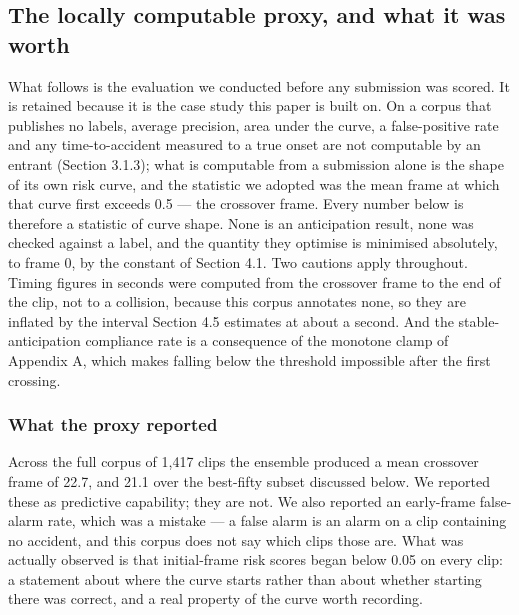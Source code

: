 \subsection{The locally computable proxy, and what it was worth}
What follows is the evaluation we conducted before any submission was scored. It is retained because it is the case study this paper is built on. On a corpus that publishes no labels, average precision, area under the curve, a false-positive rate and any time-to-accident measured to a true onset are not computable by an entrant (Section 3.1.3); what is computable from a submission alone is the shape of its own risk curve, and the statistic we adopted was the mean frame at which that curve first exceeds 0.5 --- the crossover frame. Every number below is therefore a statistic of curve shape. None is an anticipation result, none was checked against a label, and the quantity they optimise is minimised absolutely, to frame 0, by the constant of Section 4.1. Two cautions apply throughout. Timing figures in seconds were computed from the crossover frame to the end of the clip, not to a collision, because this corpus annotates none, so they are inflated by the interval Section 4.5 estimates at about a second. And the stable-anticipation compliance rate is a consequence of the monotone clamp of Appendix A, which makes falling below the threshold impossible after the first crossing.

\subsubsection{What the proxy reported}
Across the full corpus of 1,417 clips the ensemble produced a mean crossover frame of 22.7, and 21.1 over the best-fifty subset discussed below. We reported these as predictive capability; they are not. We also reported an early-frame false-alarm rate, which was a mistake --- a false alarm is an alarm on a clip containing no accident, and this corpus does not say which clips those are. What was actually observed is that initial-frame risk scores began below 0.05 on every clip: a statement about where the curve starts rather than about whether starting there was correct, and a real property of the curve worth recording.

